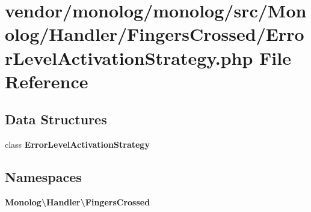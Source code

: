 \section{vendor/monolog/monolog/src/\+Monolog/\+Handler/\+Fingers\+Crossed/\+Error\+Level\+Activation\+Strategy.php File Reference}
\label{_error_level_activation_strategy_8php}
\subsection*{Data Structures}
\begin{DoxyCompactItemize}
\item 
class {\bf Error\+Level\+Activation\+Strategy}
\end{DoxyCompactItemize}
\subsection*{Namespaces}
\begin{DoxyCompactItemize}
\item 
 {\bf Monolog\textbackslash{}\+Handler\textbackslash{}\+Fingers\+Crossed}
\end{DoxyCompactItemize}
